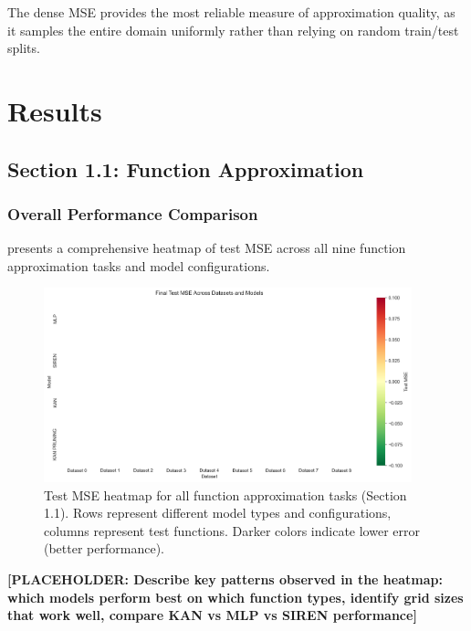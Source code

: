 \documentclass[11pt,a4paper]{article}
\begin{document}
The dense MSE provides the most reliable measure of approximation quality, as it samples the entire domain uniformly rather than relying on random train/test splits.

\section{Results}
\label{sec:results}

\subsection{Section 1.1: Function Approximation}

\subsubsection{Overall Performance Comparison}

 presents a comprehensive heatmap of test MSE across all nine function approximation tasks and model configurations.

\begin{figure}[htbp]
\centering
\includegraphics[width=0.95\textwidth]{../section1/analysis/section1_complete_analysis_20251021_143055/section1_1_analysis/01_comparative_metrics/all_datasets_heatmap_test.png}
\caption{Test MSE heatmap for all function approximation tasks (Section 1.1). Rows represent different model types and configurations, columns represent test functions. Darker colors indicate lower error (better performance).}
\label{fig:s11_heatmap}
\end{figure}

\textbf{[PLACEHOLDER: Describe key patterns observed in the heatmap: which models perform best on which function types, identify grid sizes that work well, compare KAN vs MLP vs SIREN performance]}
\end{document}
